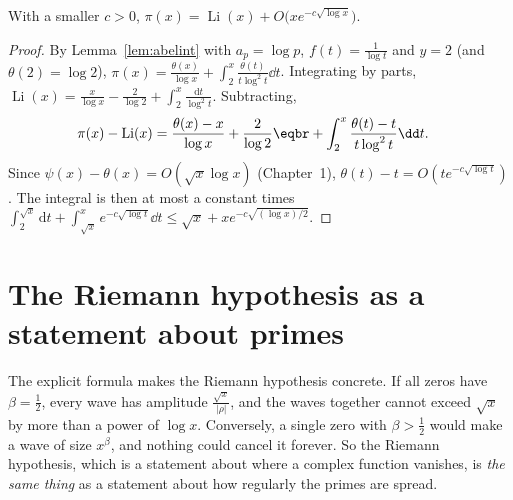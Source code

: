 \begin{corollary}\label{cor:pnterrorpi}
With a smaller $c>0$, $\pi(x)=\operatorname{Li}(x)+O\bigl(xe^{-c\sqrt{\log x}}\bigr)$.
\end{corollary}
\begin{proof}
By Lemma~\ref{lem:abelint} with $a_p=\log p$, $f(t)=\frac1{\log t}$ and $y=2$ (and $\theta(2)=\log2$), $\pi(x)=\frac{\theta(x)}{\log x}+\int_2^x\frac{\theta(t)}{t\log^2t}\dd t$. Integrating by parts,
$\operatorname{Li}(x)=\frac x{\log x}-\frac2{\log2}+\int_2^x\frac{\mathrm dt}{\log^2t}$. Subtracting,
\[
\begin{aligned}\pi(x)-\operatorname{Li}(x)&=\frac{\theta(x)-x}{\log x}+\frac2{\log2}\eqbr+\int_2^x\frac{\theta(t)-t}{t\log^2t}\dd t.\end{aligned}
\]
Since $\psi(x)-\theta(x)=O(\sqrt x\log x)$ (Chapter~1), $\theta(t)-t=O(te^{-c\sqrt{\log t}})$. The integral is then at most a constant times $\int_2^{\sqrt x}\mathrm dt+\int_{\sqrt x}^xe^{-c\sqrt{\log t}}\dd t\le\sqrt x+xe^{-c\sqrt{(\log x)/2}}$.
\end{proof}

\section{The Riemann hypothesis as a statement about primes}

The explicit formula makes the Riemann hypothesis concrete. If all zeros have $\beta=\frac12$, every wave has amplitude $\frac{\sqrt x}{|\rho|}$, and the waves together cannot exceed $\sqrt x$ by more than
a power of $\log x$. Conversely, a single zero with $\beta>\frac12$ would make a wave of size $x^\beta$, and nothing could cancel it forever. So the Riemann hypothesis, which is a statement about
where a complex function vanishes, is \emph{the same thing} as a statement about how regularly the primes are spread.

